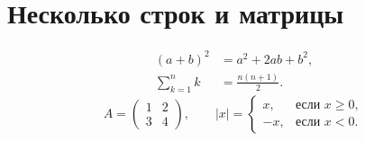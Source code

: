 \section{Несколько строк и матрицы}
\begin{align*}
  (a+b)^2 &= a^2+2ab+b^2, \\
  \sum_{k=1}^{n} k &= \frac{n(n+1)}{2}.
\end{align*}
\[
  A=\begin{pmatrix}1&2\\3&4\end{pmatrix},
  \qquad
  |x|=\begin{cases}x,&\text{если }x\geq0,\\-x,&\text{если }x<0.\end{cases}
\]

